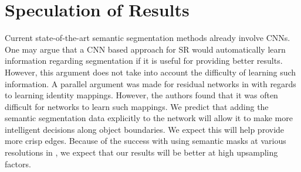 \documentclass[10pt,twocolumn,letterpaper]{article}
\begin{document}
\section{Speculation of Results}
Current state-of-the-art semantic segmentation methods already involve CNNs.
One may argue that a CNN based approach for SR would automatically learn
information regarding segmentation if it is useful for providing better
results. However, this argument does not take into account the difficulty of
learning such information. A parallel argument was made for residual networks
in \cite{ResNet} with regards to learning identity mappings. However, the
authors found that it was often difficult for networks to learn such mappings.
We predict that adding the semantic segmentation data explicitly to the network
will allow it to make more intelligent decisions along object boundaries. We
expect this will help provide more crisp edges. Because of the success with
using semantic masks at various resolutions in \cite{ImageSynthesis}, we expect
that our results will be better at high upsampling factors.

{\small


}
\end{document}
